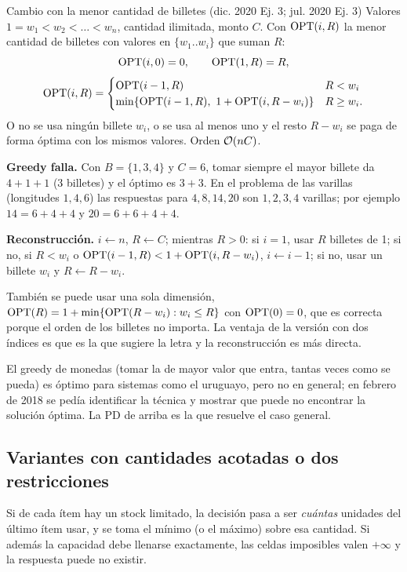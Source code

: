 \begin{problema}{Cambio con la menor cantidad de billetes (dic. 2020 Ej. 3; jul. 2020 Ej. 3)}
Valores $1=w_1<w_2<\dots<w_n$, cantidad ilimitada, monto $C$. Con
$\mathrm{OPT}(i,R)$ la menor cantidad de billetes con valores en $\{w_1..w_i\}$ que
suman $R$:
\[
\mathrm{OPT}(i,0)=0,\qquad \mathrm{OPT}(1,R)=R,
\]
\[
\mathrm{OPT}(i,R)=\begin{cases}\mathrm{OPT}(i-1,R) & R<w_i\\ \min\{\mathrm{OPT}(i-1,R),\ 1+\mathrm{OPT}(i,R-w_i)\} & R\ge w_i.\end{cases}
\]
O no se usa ningún billete $w_i$, o se usa al menos uno y el resto
$R-w_i$ se paga de forma óptima con los mismos valores. Orden $\mathcal{O}(nC)$.

\textbf{Greedy falla.} Con $B=\{1,3,4\}$ y $C=6$, tomar siempre el mayor
billete da $4+1+1$ (3 billetes) y el óptimo es $3+3$. En el problema de las
varillas (longitudes $1,4,6$) las respuestas para $4,8,14,20$ son $1,2,3,4$
varillas; por ejemplo $14=6+4+4$ y $20=6+6+4+4$.

\textbf{Reconstrucción.} $i\gets n$, $R\gets C$; mientras $R>0$: si $i=1$,
usar $R$ billetes de 1; si no, si $R<w_i$ o $\mathrm{OPT}(i-1,R)<1+\mathrm{OPT}(i,R-w_i)$,
$i\gets i-1$; si no, usar un billete $w_i$ y $R\gets R-w_i$.
\end{problema}

También se puede usar una sola dimensión,
$\mathrm{OPT}(R)=1+\min\{\mathrm{OPT}(R-w_i): w_i\le R\}$ con $\mathrm{OPT}(0)=0$, que es
correcta porque el orden de los billetes no importa. La ventaja de la versión
con dos índices es que es la que sugiere la letra y la reconstrucción es más
directa.

El greedy de monedas (tomar la de mayor valor que entra, tantas veces como
se pueda) es óptimo para sistemas como el uruguayo, pero no en general; en
febrero de 2018 se pedía identificar la técnica y mostrar que puede no
encontrar la solución óptima. La PD de arriba es la que resuelve el caso
general.

\subsection{Variantes con cantidades acotadas o dos restricciones}

Si de cada ítem hay un stock limitado, la decisión pasa a ser \emph{cuántas}
unidades del último ítem usar, y se toma el mínimo (o el máximo) sobre esa
cantidad. Si además la capacidad debe llenarse exactamente, las celdas
imposibles valen $+\infty$ y la respuesta puede no existir.

